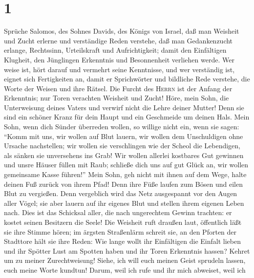 \hypertarget{section}{%
\section{1}\label{section}}

 Sprüche Salomos, des Sohnes Davids, des Königs von
Israel,  daß man Weisheit und Zucht erlerne und
verständige Reden verstehe,  daß man Gedankenzucht
erlange, Rechtssinn, Urteilskraft und Aufrichtigkeit; 
damit den Einfältigen Klugheit, den Jünglingen Erkenntnis und
Besonnenheit verliehen werde.  Wer weise ist, hört darauf
und vermehrt seine Kenntnisse, und wer verständig ist, eignet sich
Fertigkeiten an,  damit er Sprichwörter und bildliche Rede
verstehe, die Worte der Weisen und ihre Rätsel.  Die
Furcht des \textsc{Herrn} ist der Anfang der Erkenntnis; nur Toren
verachten Weisheit und Zucht!  Höre, mein Sohn, die
Unterweisung deines Vaters und verwirf nicht die Lehre deiner Mutter!
 Denn sie sind ein schöner Kranz für dein Haupt und ein
Geschmeide um deinen Hals.  Mein Sohn, wenn dich Sünder
überreden wollen, so willige nicht ein,  wenn sie sagen:
``Komm mit uns, wir wollen auf Blut lauern, wir wollen dem Unschuldigen
ohne Ursache nachstellen;  wir wollen sie verschlingen
wie der Scheol die Lebendigen, als sänken sie unversehens ins Grab!
 Wir wollen allerlei kostbares Gut gewinnen und unsre
Häuser füllen mit Raub;  schließe dich uns auf gut Glück
an, wir wollen gemeinsame Kasse führen!''  Mein Sohn, geh
nicht mit ihnen auf dem Wege, halte deinen Fuß zurück von ihrem Pfad!
 Denn ihre Füße laufen zum Bösen und eilen Blut zu
vergießen.  Denn vergeblich wird das Netz ausgespannt vor
den Augen aller Vögel;  sie aber lauern auf ihr eigenes
Blut und stellen ihrem eigenen Leben nach.  Dies ist das
Schicksal aller, die nach ungerechtem Gewinn trachten: er kostet seinen
Besitzern die Seele!  Die Weisheit ruft draußen laut,
öffentlich läßt sie ihre Stimme hören;  im ärgsten
Straßenlärm schreit sie, an den Pforten der Stadttore hält sie ihre
Reden:  Wie lange wollt ihr Einfältigen die Einfalt
lieben und ihr Spötter Lust am Spotten haben und ihr Toren Erkenntnis
hassen?  Kehret um zu meiner Zurechtweisung! Siehe, ich
will euch meinen Geist sprudeln lassen, euch meine Worte kundtun!
 Darum, weil ich rufe und ihr mich abweiset, weil ich
